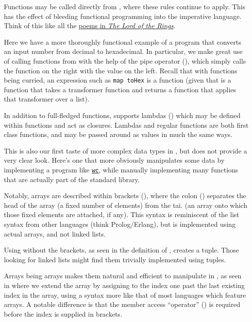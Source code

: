 Functions may be called directly from \Prose{}, where these rules continue to apply.
This has the effect of bleeding functional programming into the imperative language.
Think of this like all the
\href{https://tolkiengateway.net/wiki/Poems_in_The_Lord_of_the_Rings}{poems in \emph{The Lord of the Rings}}.


Here we have a more thoroughly functional example of a program that converts an
input number from decimal to hexadecimal. In particular, we make great use of
calling functions from \Prose{} with the help of the pipe operator (\op{|>}),
which simply calls the function on the right with the value on the left. Recall
that with functions being curried, an expression such as \texttt{map toHex} is a
function (given that  is a function that takes a transformer function and
returns a function that applies that transformer over a list).

In addition to full-fledged functions, \Poetry{} supports lambdas () which
may be defined within functions and act as closures. Lambdas and regular functions
are both first class functions, and may be passed around as values in much the same
ways.

This is also our first taste of more complex data types in \Trilogy{}, but does
not provide a very clear look. Here's one that more obviously manipulates some
data by implementing a program like \href{https://ss64.com/bash/wc.html}{\texttt{wc}},
while manually implementing many functions that are actually part of the standard library.


Notably, arrays are described within brackets (\op{[]}), where the colon
(\op{:}) separates the head of the array (a fixed number of elements) from the tai.
(an array onto which those fixed elements are attached, if any). This syntax is
reminiscent of the list syntax from other languages (think Prolog/Erlang), but
is implemented using actual arrays, and not linked lists.

Using \op{:} without the brackets, as seen in the definition of ,
creates a tuple. Those looking for linked lists might find them trivially implemented
using tuples.

Arrays being arrays makes them natural and efficient to manipulate in \Prose{}, as
seen in  where we extend the array by assigning to the index one
past the last existing index in the array, using a syntax more like that of most
languages which feature arrays. A notable difference is that the member access
``operator'' () is required before the index is supplied in brackets.

